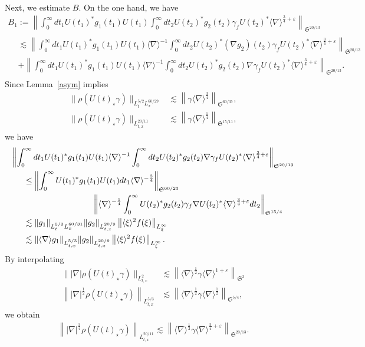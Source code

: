 \documentclass[10pt,a4paper]{amsart}
\providecommand{\No}[1]{\left\| #1 \right\|}
\newcommand{\FS}{\mathfrak{S}}
\newcommand{\ga}{\gamma}
\newcommand{\ep}{\varepsilon}
\newcommand{\rh}{\rho}
\renewcommand{\No}[1]{\left\| #1 \right\|}
\newcommand{\I}{\infty}
\newcommand{\sd}{\langle \nabla \rangle}
\newcommand{\sdi}{\sd^{-1}}
\newcommand{\lxr}{\langle \xi \rangle}
\newcommand{\tx}{{t,x}}
\newcommand{\st}{\star}
\newcommand{\ft}{{\frac{1}{4}}}
\newcommand{\fh}{\frac{3}{4}}
\newcommand{\tw}{\frac{1}{2}}
\newcommand{\na}{\nabla}
\newcommand{\ls}{\lesssim}
\begin{document}
Next, we estimate $B$. On the one hand, we have
\begin{multline}
B_1:= \No{\int_0^\I dt_1 U(t_1)^* g_1(t_1) U(t_1) \int_0^\I dt_2 U(t_2)^* g_2(t_2)\ga_f U(t_2)^* \sd^{\fh+\ep} }_{\FS^{20/13}} \\
\begin{aligned}
&\ls \No{\int_0^\I dt_1 U(t_1)^* g_1(t_1) U(t_1) \sdi \int_0^\I dt_2 U(t_2)^* (\na g_2)(t_2)\ga_f U(t_2)^* \sd^{\fh+\ep} }_{\FS^{20/13}} \\
& + \No{\int_0^\I dt_1 U(t_1)^* g_1(t_1) U(t_1) \sdi \int_0^\I dt_2 U(t_2)^* g_2(t_2)\na \ga_f U(t_2)^* \sd^{\fh+\ep} }_{\FS^{20/13}}.
\end{aligned}
\end{multline}
Since Lemma~\ref{asym} implies
\begin{align}
\|\rh(U(t)_\st \ga)\|_{L^{5/2}_t L^{60/29}_x} &\ls \left\|\ga \sd^\fh \right\|_{\FS^{60/37}}, \\
\|\rh(U(t)_\st \ga)\|_{L^{20/11}_\tx} &\ls \left\|\ga \sd^{\ft}\right\|_{\FS^{15/11}},
\end{align}
we have
\begin{multline}
\No{\int_0^\I dt_1 U(t_1)^* g_1(t_1) U(t_1) \sdi \int_0^\I dt_2 U(t_2)^* g_2(t_2)\na \ga_f U(t_2)^* \sd^{\fh+\ep} }_{\FS^{20/13}} \\
\begin{aligned}
&\le \No{\int_0^\I U(t_1)^* g_1(t_1) U(t_1) dt_1 \sd^{-\fh}}_{\FS^{60/23}}\\
&\mkern150mu
\No{\sd^{-\ft} \int_0^\I U(t_2)^* g_2(t_2)\ga_f \na U(t_2)^* \sd^{\fh+\ep} dt_2 }_{\FS^{15/4}} \\
&\ls \|g_1\|_{L^{5/3}_t L^{60/31}_x} \|g_2\|_{L^{20/9}_\tx} \left\|\lxr^{2} f(\xi)\right\|_{L^\I_\xi}\\
&\ls \|\sd g_1\|_{L^{5/3}_\tx} \|g_2\|_{L^{20/9}_\tx} \left\|\lxr^{2} f(\xi)\right\|_{L^\I_\xi}.
\end{aligned}
\end{multline}
By interpolating
\begin{align}
\||\na| \rh(U(t)_\st \ga)\|_{L^2_\tx} &\ls \left\|\sd^\tw \ga \sd^{1+\ep}\right\|_{\FS^2} \\
\left\||\na|^{\tw}\rh(U(t)_\st \ga)\right\|_{L^{5/3}_\tx} &\ls \left\|\sd^\tw \ga \sd^\tw \right\|_{\FS^{5/4}},
\end{align}
we obtain
\begin{align}
\left\||\na|^\frac{3}{4} \rh(U(t)_\st \ga)\right\|_{L^{20/11}_\tx} \ls \left\|\sd^\tw \ga \sd^{\frac{3}{4} + \ep}\right\|_{\FS^{20/13}}.
\end{align}
\end{document}
